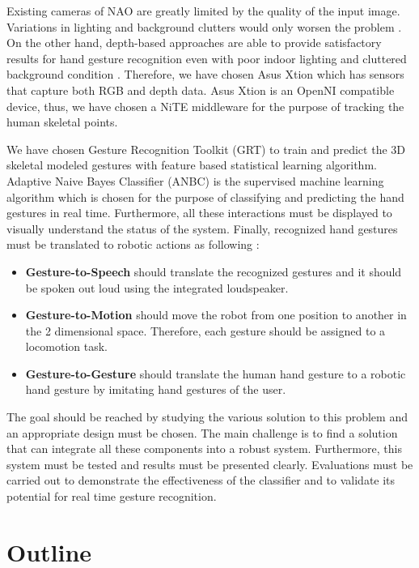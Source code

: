 Existing cameras of NAO are greatly limited by the quality of the input image. Variations in lighting and background clutters would only worsen the problem \cite{17}. On the other hand, depth-based approaches are able to provide satisfactory results for hand gesture recognition even with poor indoor lighting and cluttered background condition \cite{18}. Therefore, we have chosen Asus Xtion which has sensors that capture both RGB and depth data. Asus Xtion is an OpenNI compatible device, thus, we have chosen a NiTE middleware for the purpose of tracking the human skeletal points. 

We have chosen Gesture Recognition Toolkit (GRT) \cite{16} to train and predict the 3D skeletal modeled gestures with feature based statistical learning algorithm. Adaptive Naive Bayes Classifier (ANBC) is the supervised machine learning algorithm which is chosen for the purpose of classifying and predicting the hand gestures in real time. Furthermore, all these interactions must be displayed to visually understand the status of the system. Finally, recognized hand gestures must be translated to robotic actions as following :
\begin{itemize}
	\item \textbf{Gesture-to-Speech} should translate the recognized gestures and it should be spoken out loud using the integrated loudspeaker.
	
	\item \textbf{Gesture-to-Motion} should move the robot from one position to another in the 2 dimensional space. Therefore, each gesture should be assigned to a locomotion task.
	
	\item \textbf{Gesture-to-Gesture} should translate the human hand gesture to a robotic hand gesture by imitating hand gestures of the user. 
\end{itemize}

The goal should be reached by studying the various solution to this problem and an appropriate design must be chosen. The main challenge is to find a solution that can integrate all these components into a robust system. Furthermore, this system must be tested and results must be presented clearly. Evaluations must be carried out to demonstrate the effectiveness of the classifier and to validate its potential for real time gesture recognition.

\section{Outline}

